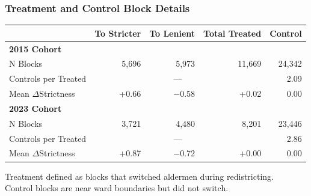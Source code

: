 
\begin{frame}[label=treatment-details]
    \frametitle{Treatment and Control Block Details}
    
    \begin{center}
    \small
    \begin{tabular}{lrrrr}
    \toprule
     & To Stricter & To Lenient & Total Treated & Control \\
    \midrule
    \multicolumn{5}{l}{\textbf{2015 Cohort}} \\
    \quad N Blocks & 5,696 & 5,973 & 11,669 & 24,342 \\
    \quad Controls per Treated & \multicolumn{3}{c}{---} & 2.09 \\
    \quad Mean $\Delta$Strictness & +0.66 & $-$0.58 & +0.02 & 0.00 \\
    \midrule
    \multicolumn{5}{l}{\textbf{2023 Cohort}} \\
    \quad N Blocks & 3,721 & 4,480 & 8,201 & 23,446 \\
    \quad Controls per Treated & \multicolumn{3}{c}{---} & 2.86 \\
    \quad Mean $\Delta$Strictness & +0.87 & $-$0.72 & +0.00 & 0.00 \\
    \bottomrule
    \end{tabular}
    \end{center}
    
    \vspace{0.5em}
    \small
    Treatment defined as blocks that switched aldermen during redistricting. \\
    Control blocks are near ward boundaries but did not switch.
    
    \vfill\hfill
    \hyperlink{sales-null}{}
    \hspace{0.3em}
    \hyperlink{treatment-example-13-23}{}
\end{frame}

